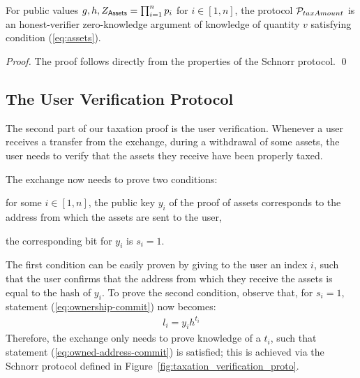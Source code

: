 \begin{theorem}\label{thm:tax-auth-proto}
    For public values $g, h, Z_{\mathsf{Assets}} = \prod_{i = 1}^n p_i$ for $i \in [1,
    n]$, the protocol $\mathcal{P}_{taxAmount}$ is an honest-verifier zero-knowledge
    argument of knowledge of quantity $v$ satisfying condition (\ref{eq:assets}).
\end{theorem}
\begin{proof}
    The proof follows directly from the properties of the Schnorr protocol.
    \qed
\end{proof}

\subsection{The User Verification Protocol}\label{subsec:user-verification-proto}

The second part of our taxation proof is the user verification. Whenever a user
receives a transfer from the exchange, \eg during a withdrawal of some assets,
the user needs to verify that the assets they receive have been properly taxed.

The exchange now needs to prove two conditions:
\begin{inparaenum}[i)]
    \item for some $i \in [1, n]$, the public key $y_i$ of the proof of assets
        corresponds to the address from which the assets are sent to the user,
    \item the corresponding bit for $y_i$ is $s_i = 1$.
\end{inparaenum}
The first condition can be easily proven by giving to the user an index $i$,
such that the user confirms that the address from which they receive the assets
is equal to the hash of $y_i$. To prove the second condition, observe that, for
$s_i = 1$, statement (\ref{eq:ownership-commit}) now becomes:
\begin{align}
    l_i = y_ih^{t_i} \label{eq:owned-address-commit}
\end{align}
Therefore, the exchange only needs to prove knowledge of a $t_i$, such that
statement (\ref{eq:owned-address-commit}) is satisfied; this is achieved via
the Schnorr protocol defined in Figure~\ref{fig:taxation_verification_proto}.


